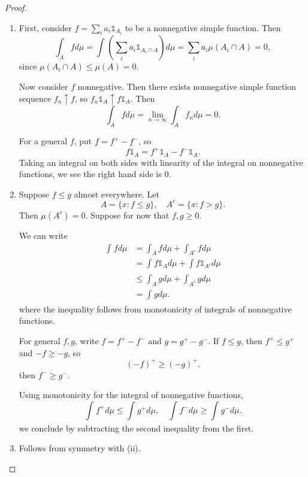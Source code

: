 \begin{proof}
	\begin{enumerate}[label=(\roman*)]
		\item First, consider $f = \sum_i a_i \mathds{1}_{A_i}$ to be a nonnegative simple function. Then \[
				\int_{A} fd\mu = \int_{}^{} \left( \sum_i a_i \mathds{1}_{A_i \cap A} \right)d\mu = \sum_i a_i \mu\left( A_i \cap A \right) = 0  
		,\] since $\mu(A_i \cap A) \le \mu(A) = 0$.

		Now consider $f$ nonnegative. Then there exists nonnegative simple function sequence $f_n \uparrow f$, so $f_n \mathds{1}_{A} \uparrow f \mathds{1}_{A}$. Then \[
			\int_{A}^{} fd\mu = \lim\limits_{n \to \infty} \int_{A}^{} f_n d\mu = 0  
		.\] 

		For a general $f$, put $f = f^+ - f^-$, so \[
			f \mathds{1}_{A} = f^+ \mathds{1}_{A} - f^- \mathds{1}_{A}
		.\] Taking an integral on both sides with linearity of the integral on nonnegative functions, we see the right hand side is $0$.
			\item Suppose $f \le g$ almost everywhere. Let
			\[
				A = \{x: f \le g\}, \quad A^{c} = \{x: f > g\}
			.\]
			Then $\mu\left( A^{c} \right) = 0$.
			Suppose for now that $f,g \ge 0$.

			We can write
				\begin{align*}
					\int_{}^{} f d\mu
					&= \int_{A}^{} fd\mu + \int_{A^{c}}^{} fd\mu \\
					&= \int_{}^{} f \mathds{1}_{A}d\mu + \int f \mathds{1}_{A^{c}}d\mu \\
					&\le \int_{A}^{} gd\mu + \int_{A^{c}} gd\mu \\
					&= \int_{}^{} gd\mu
				.\end{align*}
				where the inequality follows from monotonicity of integrals of nonnegative functions.

				For general $f,g$, write $f = f^+ - f^-$ and $g = g^+ - g^-$.
				If $f \le g$, then $f^+ \le g^+$ and $-f \ge -g$, so \[
					\left( -f \right)^{+} \ge \left( -g \right)^{+}
			.\] then $f^- \ge g^-$.

			Using monotonicity for the integral of nonnegative functions, \[
				\int_{}^{} f^+ d\mu \le \int_{}^{} g^+ d\mu ,\quad \int_{}^{} f^- d\mu \ge \int_{}^{} g^- d\mu    
			.\] we conclude by subtracting the second inequality from the first.
		\item Follows from symmetry with (ii).
	\end{enumerate}
\end{proof}

